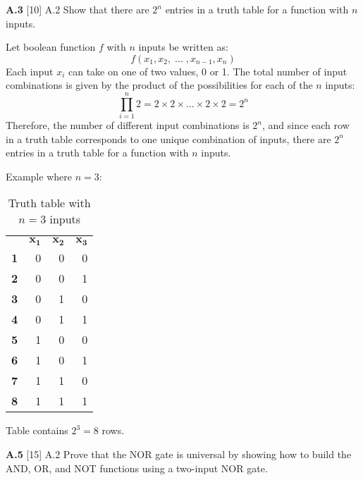 \documentclass[fleqn]{article}
\begin{document}
\vspace{0.5in}
\textbf{A.3} [10] \textlangle A.2\textrangle \; Show that there are $2^n$ entries in a truth table for a function with $n$ inputs.
\vspace{0.125in}
\begin{addmargin}[0.15cm]{0cm}
    Let boolean function $f$ with $n$ inputs be written as:
    $$f(x_1, x_2,\; ... \; , x_{n-1}, x_n)$$
    Each input $x_i$ can take on one of two values, 0 or 1. The total number of input combinations is given by the product of the possibilities for each of the $n$ inputs:
    $$\prod_{i=1}^{n} 2 = 2 \times 2 \times ... \times 2 \times 2 = 2^n$$
    Therefore, the number of different input combinations is $2^n$, and since each row in a truth table corresponds to one unique combination of inputs, there are $2^n$ entries in a truth table for a function with $n$ inputs.
    
    \vspace{0.125in}
    Example where $n = 3$:
    \begin{table}[H]
\centering
    \begin{tabular}{r|r r r}
        \multicolumn{1}{l}{} & \multicolumn{1}{c}{$\bm{x_1}$} & \multicolumn{1}{c}{$\bm{x_2}$} & \multicolumn{1}{c}{$\bm{x_3}$} \\ \cline{2-4} 
        \multicolumn{1}{r|}{\textbf{1}} & 0 & 0 & 0 \\
        \multicolumn{1}{r|}{\textbf{2}} & 0 & 0 & 1 \\
        \multicolumn{1}{r|}{\textbf{3}} & 0 & 1 & 0 \\
        \multicolumn{1}{r|}{\textbf{4}} & 0 & 1 & 1 \\
        \multicolumn{1}{r|}{\textbf{5}} & 1 & 0 & 0 \\
        \multicolumn{1}{r|}{\textbf{6}} & 1 & 0 & 1 \\
        \multicolumn{1}{r|}{\textbf{7}} & 1 & 1 & 0 \\
        \multicolumn{1}{r|}{\textbf{8}} & 1 & 1 & 1 \\
    \end{tabular}
    \caption{Truth table with $n = 3$ inputs}
\end{table}

    Table contains $2^3 = 8$ rows.
\end{addmargin}

\pagebreak

\textbf{A.5} [15] \textlangle A.2\textrangle \; Prove that the NOR gate is universal by showing how to build the AND, OR, and NOT functions using a two-input NOR gate.
\end{document}
